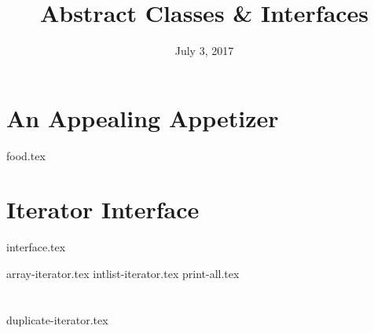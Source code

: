 \documentclass{exam}
\title{Abstract Classes \& Interfaces}
\date{July 3, 2017}
\begin{document}
\maketitle

\section{An Appealing Appetizer}
\begin{questions}
{food.tex}
\end{questions}

\clearpage

\section{Iterator Interface}
{interface.tex}
\begin{questions}
{array-iterator.tex}
\clearpage
{intlist-iterator.tex}
{print-all.tex}
\end{questions}

\clearpage

\section{}
\begin{questions}
{duplicate-iterator.tex}
\end{questions}
\end{document}
